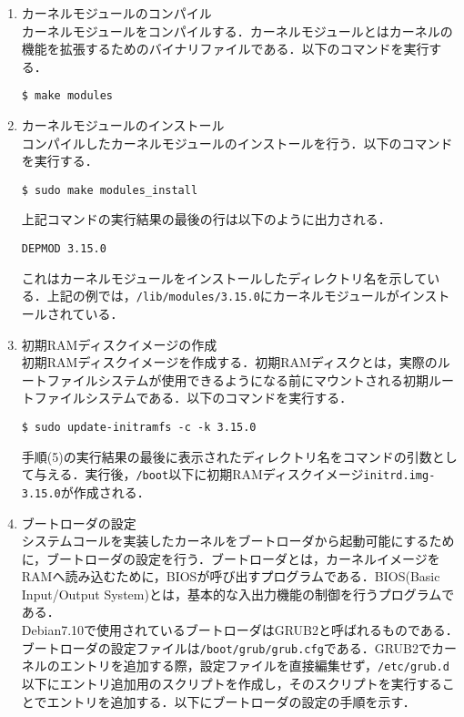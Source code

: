 \documentclass[12pt]{jsarticle}
\begin{document}
\begin{enumerate}
\item カーネルモジュールのコンパイル \\
  カーネルモジュールをコンパイルする．カーネルモジュールとはカーネルの機能を拡張するためのバイナリファイルである．以下のコマンドを実行する．

\begin{verbatim}
$ make modules
\end{verbatim}
  
\item カーネルモジュールのインストール \\
  コンパイルしたカーネルモジュールのインストールを行う．以下のコマンドを実行する．

\begin{verbatim}
$ sudo make modules_install
\end{verbatim}
上記コマンドの実行結果の最後の行は以下のように出力される．

\begin{verbatim}
DEPMOD 3.15.0
\end{verbatim}
これはカーネルモジュールをインストールしたディレクトリ名を示している．上記の例では，\verb|/lib/modules/3.15.0|にカーネルモジュールがインストールされている．

\item 初期RAMディスクイメージの作成 \\
  初期RAMディスクイメージを作成する．初期RAMディスクとは，実際のルートファイルシステムが使用できるようになる前にマウントされる初期ルートファイルシステムである．以下のコマンドを実行する．

\begin{verbatim}
$ sudo update-initramfs -c -k 3.15.0
\end{verbatim}
手順(5)の実行結果の最後に表示されたディレクトリ名をコマンドの引数として与える．実行後，\verb|/boot|以下に初期RAMディスクイメージ\verb|initrd.img-3.15.0|が作成される．

\item ブートローダの設定 \\
  システムコールを実装したカーネルをブートローダから起動可能にするために，ブートローダの設定を行う．ブートローダとは，カーネルイメージをRAMへ読み込むために，BIOSが呼び出すプログラムである．BIOS(Basic Input/Output System)とは，基本的な入出力機能の制御を行うプログラムである\cite{daniel2007}．\\
  Debian7.10で使用されているブートローダはGRUB2と呼ばれるものである．ブートローダの設定ファイルは\verb|/boot/grub/grub.cfg|である．GRUB2でカーネルのエントリを追加する際，設定ファイルを直接編集せず，\verb|/etc/grub.d|以下にエントリ追加用のスクリプトを作成し，そのスクリプトを実行することでエントリを追加する．以下にブートローダの設定の手順を示す．
  

\end{enumerate}
\end{document}
